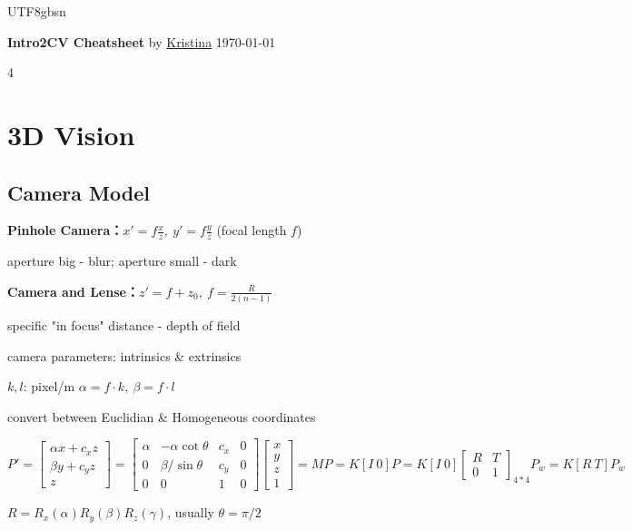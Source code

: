 \documentclass[8pt,a4paper]{extarticle}
\newcommand{\entry}[1]{\vspace{3pt}\noindent\textbf{#1：}}
\begin{document}
\begin{CJK*}{UTF8}{gbsn}

\noindent \small \textbf{Intro2CV Cheatsheet} by \underline{Kristina} \hfill \today

\begin{multicols*}{4}

\section{3D Vision}

\subsection*{Camera Model}

\entry{Pinhole Camera}$x' = f\frac{x}{z},\ y' = f\frac{y}{z}$ (focal length $f$)

aperture big - blur; aperture small - dark

\entry{Camera and Lense}$z' = f + z_0,\ f = \frac{R}{2(n-1)}$

specific "in focus" distance - depth of field

camera parameters: intrinsics \& extrinsics

$k,l$: pixel/m $\alpha = f \cdot k,\ \beta = f \cdot l$

convert between Euclidian \& Homogeneous coordinates

$P' = \left[\begin{array}{cc}
     \alpha x + c_x z  \\
     \beta y + c_y z \\
     z
\end{array} \right] = \left[ \begin{matrix}
    \alpha & -\alpha \cot\theta & c_x & 0 \\
     0 & \beta/\sin\theta & c_y & 0 \\
     0 & 0 & 1 & 0 
\end{matrix}\right] \left[\begin{array}{cc}
    x \\ y  \\ z \\ 1
\end{array}\right] = M P = K [I \ 0] P = K[I \ 0]\left[\begin{matrix}
     R& T\\
     0& 1
\end{matrix}\right]_{4*4} P_w = K [R \ T] P_w$

$R = R_x(\alpha) R_y(\beta) R_z(\gamma)$, usually $\theta = \pi/2$


\end{multicols*}
\end{CJK*}
\end{document}
